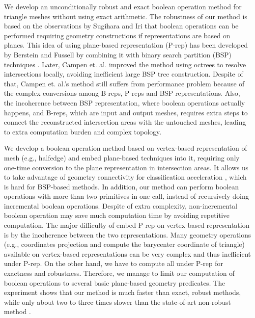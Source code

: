 \documentclass[10pt,journal,compsoc]{IEEEtran}
\begin{document}
We develop an unconditionally robust and exact boolean operation method for triangle meshes without using exact arithmetic. The robustness of our method is based on the observations by Sugihara and Iri \cite{sugihara1990solid} that boolean operations can be performed requiring geometry constructions if representations are based on planes. This idea of using plane-based representation (P-rep) has been developed by Berstein and Fussell \cite{bernstein2009fast} by combining it with binary search partition (BSP) techniques \cite{naylor1990merging,thibault1987set}. Later, Campen et. al. \cite{campen2010exact} improved the method using octrees to resolve intersections locally, avoiding inefficient large BSP tree construction. Despite of that, Campen et. al.'s method still suffers from performance problem because of the complex conversions among B-reps, P-reps and BSP representations. Also, the incoherence between BSP representation, where boolean operations actually happens, and B-reps, which are input and output meshes, requires extra steps to connect the reconstructed intersection areas with the untouched meshes, leading to extra computation burden and complex topology.

We develop a boolean operation method based on vertex-based representation of mesh (e.g., halfedge) and embed plane-based techniques into it, requiring only one-time conversion to the plane representation in intersection areas. It allows us to take advantage of geometry connectivity for classification acceleration \cite{feito2013fast,ogayar2015deferred,updegrove2016boolean}, which is hard for BSP-based methods. In addition, our method can perform boolean operations with more than two primitives in one call, instead of recursively doing incremental boolean operations. Despite of extra complexity, non-incremental boolean operation may save much computation time by avoiding repetitive computation. The major difficulty of embed P-rep on vertex-based representation is by the incoherence between the two representations. Many geometry operations (e.g., coordinates projection and compute the barycenter coordinate of triangle) available on vertex-based representations can be very complex and thus inefficient under P-rep. On the other hand, we have to compute all under P-rep for exactness and robustness. Therefore, we manage to limit our computation of boolean operations to several basic plane-based geometry predicates. The experiment shows that our method is much faster than exact, robust methods, while only about two to three times slower than the state-of-art non-robust method \cite{douze2015quickcsg}.
\end{document}
